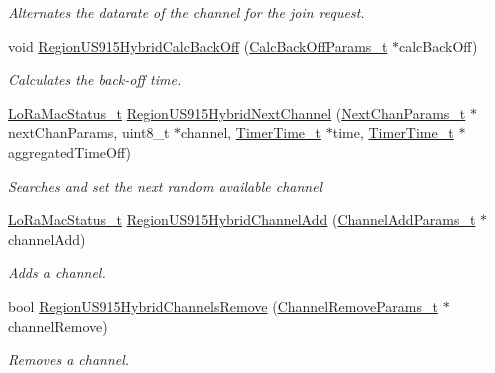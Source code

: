 \begin{DoxyCompactItemize}
\begin{DoxyCompactList}\small\item\em Alternates the datarate of the channel for the join request. \end{DoxyCompactList}\item 
void \mbox{\hyperlink{group___r_e_g_i_o_n_u_s915_h_y_b_ga410890efd066c15fb3452cf8ae8362e9}{Region\+U\+S915\+Hybrid\+Calc\+Back\+Off}} (\mbox{\hyperlink{group___r_e_g_i_o_n_ga7c5c9a8da174e6679eded8257dc92fd9}{Calc\+Back\+Off\+Params\+\_\+t}} $\ast$calc\+Back\+Off)
\begin{DoxyCompactList}\small\item\em Calculates the back-\/off time. \end{DoxyCompactList}\item 
\mbox{\hyperlink{group___l_o_r_a_m_a_c_ga30bd25657e10480f8605ee951b0ecfbd}{Lo\+Ra\+Mac\+Status\+\_\+t}} \mbox{\hyperlink{group___r_e_g_i_o_n_u_s915_h_y_b_gae74c05f827a9ed78b0ec0cacdec45f28}{Region\+U\+S915\+Hybrid\+Next\+Channel}} (\mbox{\hyperlink{group___r_e_g_i_o_n_ga115f5e83afae352c0a3dcdc193374040}{Next\+Chan\+Params\+\_\+t}} $\ast$next\+Chan\+Params, uint8\+\_\+t $\ast$channel, \mbox{\hyperlink{utilities_8h_a4215ca43d3e953099ea758ce428599d0}{Timer\+Time\+\_\+t}} $\ast$time, \mbox{\hyperlink{utilities_8h_a4215ca43d3e953099ea758ce428599d0}{Timer\+Time\+\_\+t}} $\ast$aggregated\+Time\+Off)
\begin{DoxyCompactList}\small\item\em Searches and set the next random available channel \end{DoxyCompactList}\item 
\mbox{\hyperlink{group___l_o_r_a_m_a_c_ga30bd25657e10480f8605ee951b0ecfbd}{Lo\+Ra\+Mac\+Status\+\_\+t}} \mbox{\hyperlink{group___r_e_g_i_o_n_u_s915_h_y_b_ga82fc4da7c52d7b26a8fcd8704c8af9ab}{Region\+U\+S915\+Hybrid\+Channel\+Add}} (\mbox{\hyperlink{group___r_e_g_i_o_n_gab1c5f3aa06614283202906cef4417860}{Channel\+Add\+Params\+\_\+t}} $\ast$channel\+Add)
\begin{DoxyCompactList}\small\item\em Adds a channel. \end{DoxyCompactList}\item 
bool \mbox{\hyperlink{group___r_e_g_i_o_n_u_s915_h_y_b_ga01abfdc17109559ec3375226baf72331}{Region\+U\+S915\+Hybrid\+Channels\+Remove}} (\mbox{\hyperlink{group___r_e_g_i_o_n_gaa37468560d2fc81a977b57a48e5d72c0}{Channel\+Remove\+Params\+\_\+t}} $\ast$channel\+Remove)
\begin{DoxyCompactList}\small\item\em Removes a channel. \end{DoxyCompactList}\item 

\end{DoxyCompactItemize}
